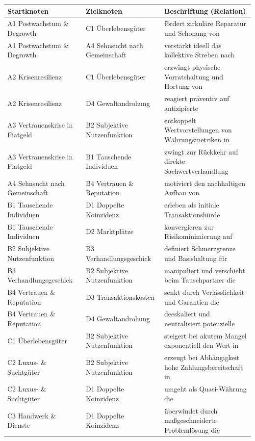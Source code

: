 \documentclass[11pt, a4paper]{article}
\begin{document}
{\small
\begin{longtable}{@{}p{4.2cm}p{4.2cm}p{7.6cm}@{}}
\toprule
\textbf{Startknoten} & \textbf{Zielknoten} & \textbf{Beschriftung (Relation)} \\
\midrule
\endhead
A1 Postwachstum \& Degrowth & C1 Überlebensgüter & fördert zirkuläre Reparatur und Schonung von \\
A1 Postwachstum \& Degrowth & A4 Sehnsucht nach Gemeinschaft & verstärkt ideell das kollektive Streben nach \\
A2 Krisenresilienz & C1 Überlebensgüter & erzwingt physische Vorratshaltung und Hortung von \\
A2 Krisenresilienz & D4 Gewaltandrohung & reagiert präventiv auf antizipierte \\
A3 Vertrauenskrise in Fiatgeld & B2 Subjektive Nutzenfunktion & entkoppelt Wertvorstellungen von Währungsmetriken in \\
A3 Vertrauenskrise in Fiatgeld & B1 Tauschende Individuen & zwingt zur Rückkehr auf direkte Sachwertverhandlung \\
A4 Sehnsucht nach Gemeinschaft & B4 Vertrauen \& Reputation & motiviert den nachhaltigen Aufbau von \\
B1 Tauschende Individuen & D1 Doppelte Koinzidenz & erleben als initiale Transaktionshürde \\
B1 Tauschende Individuen & D2 Marktplätze & konvergieren zur Risikominimierung auf \\
B2 Subjektive Nutzenfunktion & B3 Verhandlungsgeschick & definiert Schmerzgrenze und Basishaltung für \\
B3 Verhandlungsgeschick & B2 Subjektive Nutzenfunktion & manipuliert und verschiebt beim Tauschpartner die \\
B4 Vertrauen \& Reputation & D3 Transaktionskosten & senkt durch Verlässlichkeit und Garantien die \\
B4 Vertrauen \& Reputation & D4 Gewaltandrohung & deeskaliert und neutralisiert potenzielle \\
C1 Überlebensgüter & B2 Subjektive Nutzenfunktion & steigert bei akutem Mangel exponentiell den Wert in \\
C2 Luxus- \& Suchtgüter & B2 Subjektive Nutzenfunktion & erzeugt bei Abhängigkeit hohe Zahlungsbereitschaft in \\
C2 Luxus- \& Suchtgüter & D1 Doppelte Koinzidenz & umgeht als Quasi-Währung die \\
C3 Handwerk \& Dienste & D1 Doppelte Koinzidenz & überwindet durch maßgeschneiderte Problemlösung die \\

\end{longtable}}
\end{document}
